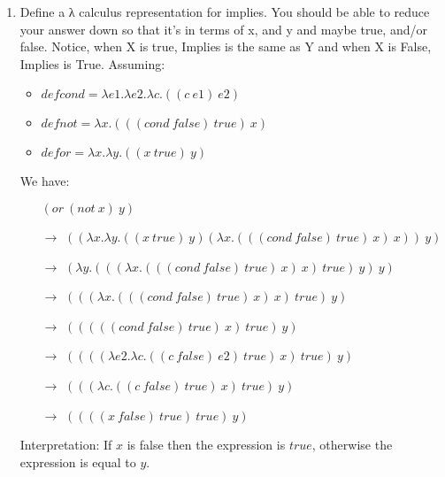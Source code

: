 \documentclass[12pt]{letter}
\begin{document}
\begin{enumerate}
		\item Define a λ calculus representation for implies. You
should be able to reduce your answer down so that it's in terms
of x, and y and maybe true, and/or false. Notice, when X is true,
Implies is the same as Y and when X is False, Implies is True.
			Assuming:
			\begin{itemize}
				\item $def cond = λe1.λe2.λc.((c~e1)~e2)$
				\item $def not = λx.(((cond~false)~true)~x)$
				\item $def or= λx.λy.((x~true)~y)$
			\end{itemize}

			We have:
			\begin{itemize}
				\item[]
				$(or~(not~x)~y)$
				\item[$\rightarrow$]
				$((\lambda x.\lambda y.((x~true)~y) (\lambda x.(((cond~false)~true)~x)~x))~y)$
				\item[$\rightarrow$]
				$(\lambda y.(((\lambda x.(((cond~false)~true)~x)~x)~true)~y)~y)$
				\item[$\rightarrow$]
				$(((\lambda x.(((cond~false)~true)~x)~x)~true)~y)$
				\item[$\rightarrow$]
				$(((((cond~false)~true)~x)~true)~y)$
				\item[$\rightarrow$]
				$((((\lambda e2.\lambda c.((c~false)~e2)~true)~x)~true)~y)$
				\item[$\rightarrow$]
				$(((\lambda c.((c~false)~true)~x)~true)~y)$
				\item[$\rightarrow$]
				$((((x~false)~true)~true)~y)$
			\end{itemize}
			
			Interpretation: If $x$ is false then the expression is $true$, otherwise the expression is equal to $y$.
			
	\end{enumerate}
\end{document}
